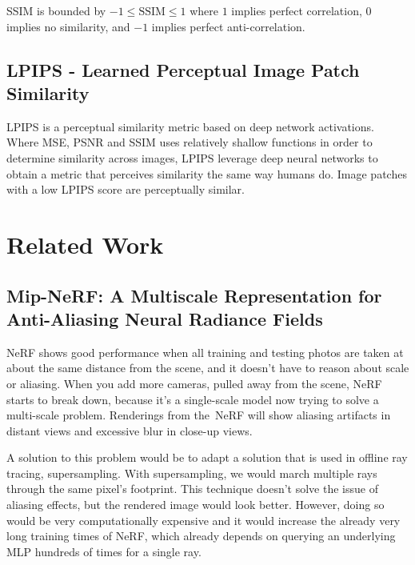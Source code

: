 SSIM is bounded by $-1 \leq \text{SSIM} \leq 1$ where $1$ implies perfect correlation, $0$ implies no similarity, and $-1$ implies perfect anti-correlation.

\subsection{LPIPS - Learned Perceptual Image Patch Similarity}
LPIPS \cite{zhang_unreasonable_2018} is a perceptual similarity metric based on deep network activations. Where MSE, PSNR and SSIM uses relatively shallow functions in order to determine similarity across images, LPIPS leverage deep neural networks to obtain a metric that perceives similarity the same way humans do. Image patches with a low LPIPS score are perceptually similar.





\section{Related Work}
\subsection{Mip-NeRF: A Multiscale Representation for Anti-Aliasing Neural Radiance Fields} \label{sec:mipnerf}
NeRF shows good performance when all training and testing photos are taken at about the same distance from the scene, and it doesn't have to reason about scale or aliasing. When you add more cameras, pulled away from the scene, NeRF starts to break down, because it's a single-scale model now trying to solve a multi-scale problem. Renderings from the NeRF will show aliasing artifacts in distant views and excessive blur in close-up views.

A solution to this problem would be to adapt a solution that is used in offline ray tracing, supersampling. With supersampling, we would march multiple rays through the same pixel's footprint. This technique doesn't solve the issue of aliasing effects, but the rendered image would look better. However, doing so would be very computationally expensive and it would increase the already very long training times of NeRF, which already depends on querying an underlying MLP hundreds of times for a single ray.

